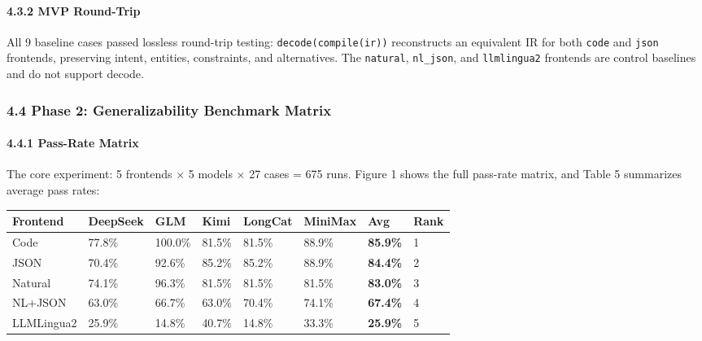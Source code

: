 \paragraph{4.3.2 MVP Round-Trip}\label{mvp-round-trip}



All 9 baseline cases passed lossless round-trip testing: \texttt{decode(compile(ir))} reconstructs an equivalent IR for both \texttt{code} and \texttt{json} frontends, preserving intent, entities, constraints, and alternatives. The \texttt{natural}, \texttt{nl\_json}, and \texttt{llmlingua2} frontends are control baselines and do not support decode.



\subsubsection{4.4 Phase 2: Generalizability Benchmark Matrix}\label{phase-2-generalizability-benchmark-matrix}



\paragraph{4.4.1 Pass-Rate Matrix}\label{pass-rate-matrix}



The core experiment: 5 frontends × 5 models × 27 cases = 675 runs. Figure 1 shows the full pass-rate matrix, and Table 5 summarizes average pass rates:



{\def\LTcaptype{none} %

\begin{longtable}[]{@{}llllllll@{}}

\toprule\noalign{}

Frontend & DeepSeek & GLM & Kimi & LongCat & MiniMax & \textbf{Avg} & \textbf{Rank} \\

\midrule\noalign{}

\endhead

\bottomrule\noalign{}

\endlastfoot

Code & 77.8\% & 100.0\% & 81.5\% & 81.5\% & 88.9\% & \textbf{85.9\%} & 1 \\

JSON & 70.4\% & 92.6\% & 85.2\% & 85.2\% & 88.9\% & \textbf{84.4\%} & 2 \\

Natural & 74.1\% & 96.3\% & 81.5\% & 81.5\% & 81.5\% & \textbf{83.0\%} & 3 \\

NL+JSON & 63.0\% & 66.7\% & 63.0\% & 70.4\% & 74.1\% & \textbf{67.4\%} & 4 \\

LLMLingua2 & 25.9\% & 14.8\% & 40.7\% & 14.8\% & 33.3\% & \textbf{25.9\%} & 5 \\

\end{longtable}

}



